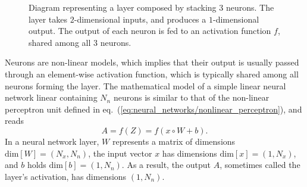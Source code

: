 \begin{figure}[H]
	\caption{
        Diagram representing a layer composed by stacking $3$ neurons. The layer takes
        $2$-dimensional inputs, and produces a $1$-dimensional output. The output of each neuron is
        fed to an activation function $f$, shared among all $3$ neurons.
    }\label{fig:neural_networks/layer}
	\centering
\end{figure}

Neurons are non-linear models, which implies that their output is usually passed through an element-wise
activation function, which is typically shared among all neurons forming the layer. The mathematical model of
a simple linear neural network linear containing $N_n$ neurons is similar to that of the non-linear perceptron
unit defined in eq.~(\ref{eq:neural_networks/nonlinear_perceptron}), and reads
\begin{equation}
    A = f(Z) = f(x \circ W + b).
    \label{eq:neural_networks/layer}
\end{equation}
In a neural network layer, $W$ represents a matrix of dimensions $\text{dim}[W] = (N_x, N_n)$, the input
vector $x$ has dimensions $\text{dim}[x] = (1, N_x)$, and $b$ holds $\text{dim}[b] = (1, N_n)$. As a result,
the output $A$, sometimes called the layer's activation, has dimensions $(1, N_n)$.

